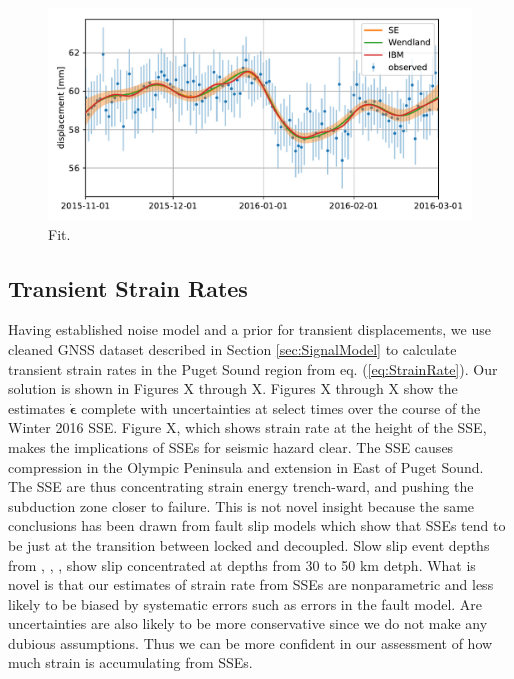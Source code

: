 \documentclass[10pt,a4paper]{article}
\begin{document}
\begin{figure}
\includegraphics{figures/signal_fit/signal-fit.pdf}
\caption{Fit.}   
\label{fig:Fit}
\end{figure}

\subsection{Transient Strain Rates} 
Having established noise model and a prior for transient displacements, we use cleaned GNSS dataset described in Section \ref{sec:SignalModel} to calculate transient strain rates in the Puget Sound region from eq. (\ref{eq:StrainRate}). Our solution is shown in Figures X through X. Figures X through X show the estimates $\dot{\bm{\epsilon}}$ complete with uncertainties at select times over the course of the Winter 2016 SSE. Figure X, which shows strain rate at the height of the SSE, makes the implications of SSEs for seismic hazard clear.  The SSE causes compression in the Olympic Peninsula and extension in East of Puget Sound. The SSE are thus concentrating strain energy trench-ward, and pushing the subduction zone closer to failure. This is not novel insight because the same conclusions has been drawn from fault slip models which show that SSEs tend to be just at the transition between locked and decoupled. Slow slip event depths from \citet{Dragert2001}, \citet{Wech2009}, \citet{Schmidt2010}, \citet{Bartlow2011} show slip concentrated at depths from 30 to 50 km detph. What is novel is that our estimates of strain rate from SSEs are nonparametric and less likely to be biased by systematic errors such as errors in the fault model. Are uncertainties are also likely to be more conservative since we do not make any dubious assumptions. Thus we can be more confident in our assessment of how much strain is accumulating from SSEs.
\end{document}
